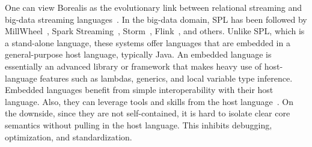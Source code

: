 One can
view Borealis as the evolutionary link between relational streaming
and big-data streaming languages~\cite{abadi_et_al_2005}.
In the big-data domain, SPL has been followed by
MillWheel~\cite{akidau_et_al_2013}, Spark
Streaming~\cite{zaharia_et_al_2013},
Storm~\cite{toshniwal_et_al_2014}, Flink~\cite{carbone_et_al_2015},
and others.  Unlike SPL, which is a stand-alone language, these
systems offer languages that are embedded in a general-purpose host
language, typically Java. An embedded language is essentially an
advanced library or framework that makes heavy use of host-language
features such as lambdas, generics, and local variable type
inference. Embedded languages benefit from simple interoperability
with their host language. Also, they can leverage tools and skills
from the host language~\cite{hudak_1998}. On the downside, since they
are not self-contained, it is hard to isolate clear core semantics
without pulling in the host language. This inhibits debugging,
optimization, and standardization.
